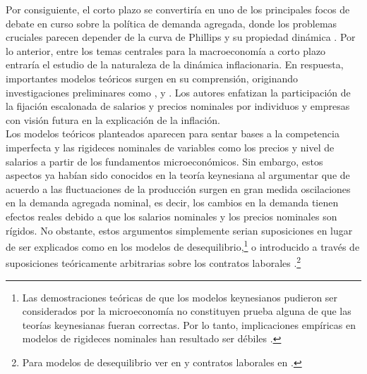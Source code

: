 Por consiguiente, el corto plazo se convertiría en uno de los principales focos de debate en curso sobre la política de demanda agregada, donde los problemas cruciales parecen depender de la curva de Phillips y su propiedad dinámica \citep{taylor1979staggered}. Por lo anterior, entre los temas centrales para la macroeconomía a corto plazo entraría el estudio de la naturaleza de la dinámica inflacionaria. En respuesta, importantes modelos teóricos surgen en su comprensión, originando investigaciones preliminares como \cite{calvo1983staggered}, \cite{taylor1980aggregate} y \cite{fischer1977long}. Los autores enfatizan la participación de la fijación escalonada de salarios y precios nominales por individuos y empresas con visión futura en la explicación de la inflación.\\
 
 Los modelos teóricos planteados aparecen para sentar bases a la competencia imperfecta y las rigideces nominales de variables como los precios y nivel de salarios a partir de los fundamentos microeconómicos. Sin embargo, estos aspectos ya habían sido conocidos en la teoría keynesiana al argumentar que de acuerdo a las fluctuaciones de la producción surgen en gran medida oscilaciones en la demanda agregada nominal, es decir, los cambios en la demanda tienen efectos reales debido a que los salarios nominales y los precios nominales son rígidos. No obstante, estos argumentos simplemente serian suposiciones en lugar de ser explicados como en los modelos de desequilibrio,\footnote{Las demostraciones teóricas de que los modelos keynesianos pudieron ser considerados por la microeconomía  no constituyen prueba alguna de que las teorías keynesianas fueran correctas. Por lo tanto, implicaciones empíricas en modelos de rigideces nominales han resultado ser débiles \citep{summers1991should}.}  o introducido a través de suposiciones teóricamente arbitrarias sobre los contratos laborales \citep{ball1988new}.\footnote{Para modelos de desequilibrio ver en \cite{barro1971general} y contratos laborales en \cite{fischer1977long}.} \\
 
